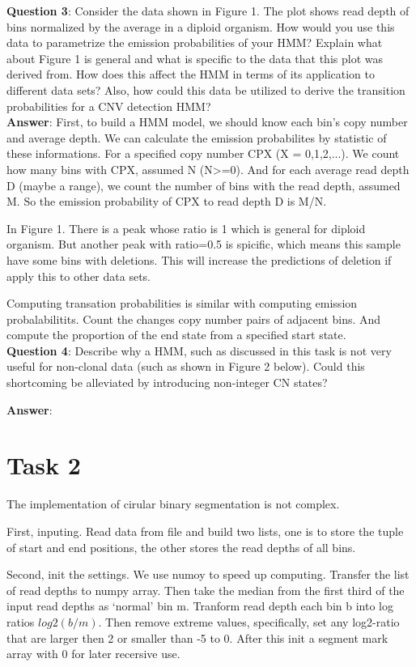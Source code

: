 \documentclass[a4paper]{article}
\begin{document}
\noindent\textbf{Question 3}: Consider the data shown in Figure 1. The plot shows read depth of bins normalized by the average in a diploid organism. How would you use this data to parametrize the emission probabilities of your HMM? Explain what about Figure 1 is general and what is specific to the data that this plot was derived from. How does this affect the HMM in terms of its application to different data sets? Also, how could this data be utilized to derive the transition probabilities for a CNV detection HMM?\\

\noindent\textbf{Answer}: First, to build a HMM model, we should know each bin's copy number and average depth. We can calculate the emission probabilites by statistic of these informations. For a specified copy number CPX (X = 0,1,2,...). We count how many bins with CPX, assumed N (N>=0). And for each average read depth D (maybe a range), we count the number of bins with the read depth, assumed M. So the emission probability of CPX to read depth D is M/N. 

In Figure 1. There is a peak whose ratio is 1 which is general for diploid organism. But another peak with ratio=0.5 is spicific, which means this sample have some bins with deletions. This will increase the predictions of deletion if apply this to other data sets. 

Computing transation probabilities is similar with computing emission probalabilitits. Count the changes copy number pairs of adjacent bins. And compute the proportion of the end state from a specified start state.\\

\noindent\textbf{Question 4}: Describe why a HMM, such as discussed in this task is not very useful for non-clonal data (such as shown in Figure 2 below). Could this shortcoming be alleviated by introducing non-integer CN states?

\noindent\textbf{Answer}: 

\section{Task 2}

The implementation of cirular binary segmentation is not complex. 

First, inputing. Read data from file and build two lists, one is to store the tuple of start and end positions, the other stores the read depths of all bins. 

Second, init the settings. We use numoy to speed up computing. Transfer the list of read depths to numpy array. Then take the median from the first third of the input read depths as `normal' bin m. Tranform read depth each bin b into log ratios $log2(b/m)$. Then remove extreme values, specifically, set any log2-ratio that are larger then 2 or smaller than -5 to 0. After this init a segment mark array with 0 for later recersive use. 
\end{document}
